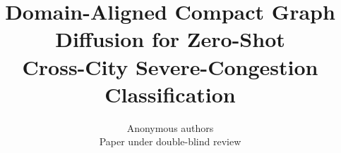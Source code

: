 \documentclass{article}
\title{Domain-Aligned Compact Graph Diffusion for Zero-Shot \\ Cross-City Severe-Congestion Classification}
\author{Anonymous authors \\ Paper under double-blind review}
\date{}
\newif\ifhasrealstyle
\begin{document}
\maketitle

\ifhasrealstyle\else\PLACEHOLDERBANNER\fi

















\newpage
\appendix

\end{document}
